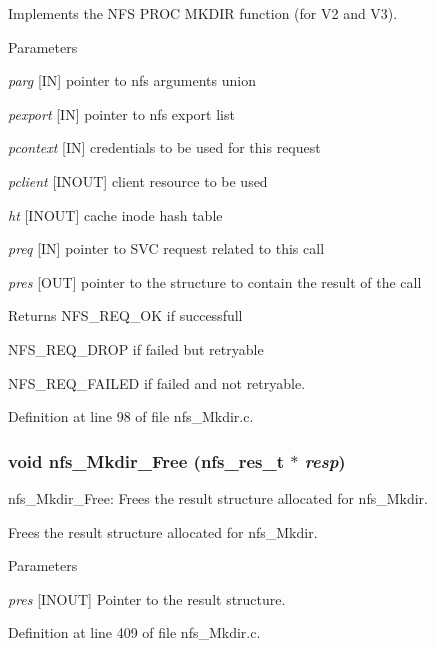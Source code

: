 Implements the NFS PROC MKDIR function (for V2 and V3).


\begin{DoxyParams}{Parameters}
\item[{\em parg}][IN] pointer to nfs arguments union \item[{\em pexport}][IN] pointer to nfs export list \item[{\em pcontext}][IN] credentials to be used for this request \item[{\em pclient}][INOUT] client resource to be used \item[{\em ht}][INOUT] cache inode hash table \item[{\em preq}][IN] pointer to SVC request related to this call \item[{\em pres}][OUT] pointer to the structure to contain the result of the call\end{DoxyParams}
\begin{DoxyReturn}{Returns}
NFS\_\-REQ\_\-OK if successfull \par
 NFS\_\-REQ\_\-DROP if failed but retryable \par
 NFS\_\-REQ\_\-FAILED if failed and not retryable. 
\end{DoxyReturn}


Definition at line 98 of file nfs\_\-Mkdir.c.
\subsubsection[{nfs\_\-Mkdir\_\-Free}]{\setlength{\rightskip}{0pt plus 5cm}void nfs\_\-Mkdir\_\-Free (nfs\_\-res\_\-t $\ast$ {\em resp})}\label{nfs__Mkdir_8c_a22feb265c8dc65333618da08a366ac09}
nfs\_\-Mkdir\_\-Free: Frees the result structure allocated for nfs\_\-Mkdir.

Frees the result structure allocated for nfs\_\-Mkdir.


\begin{DoxyParams}{Parameters}
\item[{\em pres}][INOUT] Pointer to the result structure. \end{DoxyParams}


Definition at line 409 of file nfs\_\-Mkdir.c.